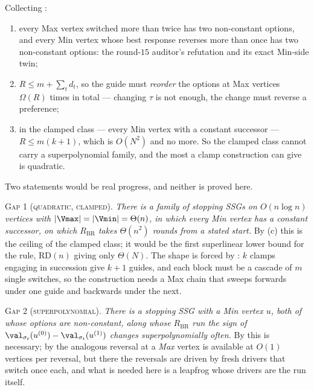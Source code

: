 \begin{remark}\label{bsc:programme}
Collecting :
\begin{enumerate}
\item[(a)] every Max vertex switched more than twice has two non-constant
 options, and every Min vertex whose best response reverses more than once has
 two non-constant options: the round-$15$ auditor's refutation and its exact
 Min-side twin;
\item[(b)] $R\le m+\sum_td_t$, so the guide must \emph{reorder} the options at
 Max vertices $\Omega(R)$ times in total --- changing $\tau$ is not enough,
 the change must reverse a preference;
\item[(c)] in the clamped class --- every Min vertex with a constant successor
 --- $R\le m(k+1)$, which is $O(N^{2})$ and no more.  So the clamped class
 cannot carry a superpolynomial family, and the most a clamp construction can
 give is quadratic.
\end{enumerate}
Two statements would be real progress, and neither is proved here.

\medskip\noindent\textsc{Gap 1 (quadratic, clamped).} \emph{There is a family
of stopping SSGs on $O(n\log n)$ vertices with $|\Vmax|=|\Vmin|=\Theta(n)$, in
which every Min vertex has a constant successor, on which $R_{\mathrm{BR}}$
takes $\Theta(n^{2})$ rounds from a stated start.}  By (c) this is the
ceiling of the clamped class; it would be the first superlinear lower bound
for the rule, $\mathrm{RD}(n)$ giving only $\Theta(N)$.  The shape is forced
by : $k$ clamps engaging in succession give $k+1$ guides,
and each block must be a cascade of $m$ single switches, so the construction
needs a Max chain that sweeps forwards under one guide and backwards under the
next.

\medskip\noindent\textsc{Gap 2 (superpolynomial).} \emph{There is a stopping
SSG with a Min vertex $u$, both of whose options are non-constant, along whose
$R_{\mathrm{BR}}$ run the sign of
$\val_{\sigma_t}(u^{(0)})-\val_{\sigma_t}(u^{(1)})$ changes superpolynomially
often.}  By  this is necessary; by  the
analogous reversal at a \emph{Max} vertex is available at $O(1)$ vertices per
reversal, but there the reversals are driven by fresh drivers that switch once
each, and what is needed here is a leapfrog whose drivers are the run itself.
\end{remark}